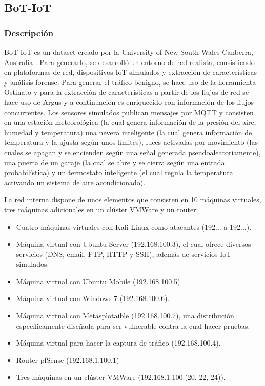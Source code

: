 
\subsection{BoT-IoT}

\subsubsection{Descripción}

BoT-IoT es un dataset creado por la University of New South Wales Canberra, Australia \cite{DBLP:journals/corr/abs-1811-00701}. Para generarlo, se desarrolló un entorno de red realista, consistiendo en plataformas de red, dispositivos IoT simulados y extracción de características y análisis forense. Para generar el tráfico benigno, se hace uso de la herramienta Ostinato \cite{ostinato} y para la extracción de características a partir de los flujos de red se hace uso de Argus \cite{argustool} y a continuación es enriquecido con información de los flujos concurrentes. Los sensores simulados publican mensajes por MQTT y consisten en una estación meteorológica (la cual genera información de la presión del aire, humedad y temperatura) una nevera inteligente (la cual genera información de temperatura y la ajusta según unos límites), luces activadas por movimiento (las cuales se apagan y se encienden según una señal generada pseudoaleatoriamente), una puerta de un garaje (la cual se abre y se cierra según una entrada probabilística) y un termostato inteligente (el cual regula la temperatura activando un sistema de aire acondicionado).

La red interna dispone de unos elementos que consisten en 10 máquinas virtuales, tres máquinas adicionales en un clúster VMWare y un router:

\begin{itemize}
    \item Cuatro máquinas virtuales con Kali Linux como atacantes (192... a 192...).
    \item Máquina virtual con Ubuntu Server (192.168.100.3), el cual ofrece diversos servicios (DNS, email, FTP, HTTP y SSH), además de servicios IoT simulados.
    \item Máquina virtual con Ubuntu Mobile (192.168.100.5).
    \item Máquina virtual con Windows 7 (192.168.100.6).
    \item Máquina virtual con Metasplotaible (192.168.100.7), una distribución específicamente diseñada para ser vulnerable contra la cual hacer pruebas.
    \item Máquina virtual para hacer la captura de tráfico (192.168.100.4).
    \item Router pfSense (192.168.1.100.1)
    \item Tres máquinas en un clúster VMWare (192.168.1.100.(20, 22, 24)).
\end{itemize}

